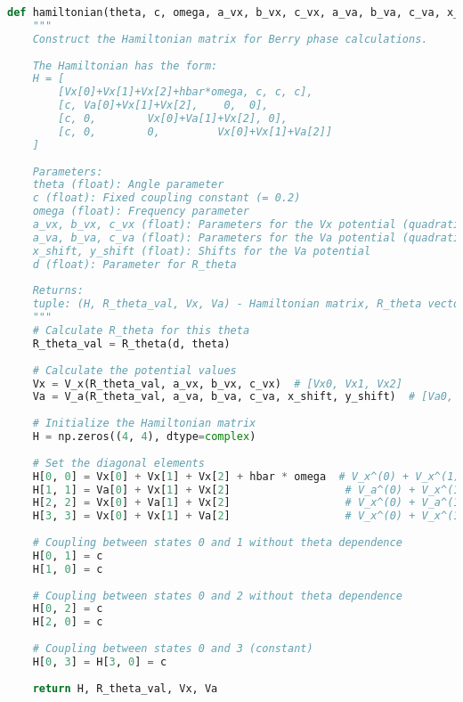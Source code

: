 \documentclass[12pt,a4paper]{article}
\begin{document}
\begin{lstlisting}[language=Python, caption=Hamiltonian construction]
def hamiltonian(theta, c, omega, a_vx, b_vx, c_vx, a_va, b_va, c_va, x_shift, y_shift, d):
    """
    Construct the Hamiltonian matrix for Berry phase calculations.
    
    The Hamiltonian has the form:
    H = [
        [Vx[0]+Vx[1]+Vx[2]+hbar*omega, c, c, c],
        [c, Va[0]+Vx[1]+Vx[2],    0,  0],
        [c, 0,        Vx[0]+Va[1]+Vx[2], 0],
        [c, 0,        0,         Vx[0]+Vx[1]+Va[2]]
    ]
    
    Parameters:
    theta (float): Angle parameter
    c (float): Fixed coupling constant (= 0.2)
    omega (float): Frequency parameter
    a_vx, b_vx, c_vx (float): Parameters for the Vx potential (quadratic, linear, constant terms)
    a_va, b_va, c_va (float): Parameters for the Va potential (quadratic, linear, constant terms)
    x_shift, y_shift (float): Shifts for the Va potential
    d (float): Parameter for R_theta
    
    Returns:
    tuple: (H, R_theta_val, Vx, Va) - Hamiltonian matrix, R_theta vector, Vx and Va values
    """
    # Calculate R_theta for this theta
    R_theta_val = R_theta(d, theta)
    
    # Calculate the potential values
    Vx = V_x(R_theta_val, a_vx, b_vx, c_vx)  # [Vx0, Vx1, Vx2]
    Va = V_a(R_theta_val, a_va, b_va, c_va, x_shift, y_shift)  # [Va0, Va1, Va2]
    
    # Initialize the Hamiltonian matrix
    H = np.zeros((4, 4), dtype=complex)
    
    # Set the diagonal elements
    H[0, 0] = Vx[0] + Vx[1] + Vx[2] + hbar * omega  # V_x^(0) + V_x^(1) + V_x^(2) + hbar*omega
    H[1, 1] = Va[0] + Vx[1] + Vx[2]                  # V_a^(0) + V_x^(1) + V_x^(2)
    H[2, 2] = Vx[0] + Va[1] + Vx[2]                  # V_x^(0) + V_a^(1) + V_x^(2)
    H[3, 3] = Vx[0] + Vx[1] + Va[2]                  # V_x^(0) + V_x^(1) + V_a^(2)
    
    # Coupling between states 0 and 1 without theta dependence
    H[0, 1] = c 
    H[1, 0] = c 
    
    # Coupling between states 0 and 2 without theta dependence
    H[0, 2] = c 
    H[2, 0] = c
    
    # Coupling between states 0 and 3 (constant)
    H[0, 3] = H[3, 0] = c
    
    return H, R_theta_val, Vx, Va
\end{lstlisting}
\end{document}
